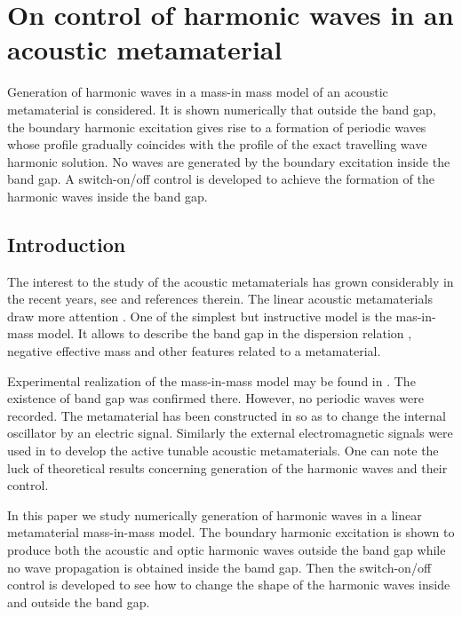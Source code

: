 \chapter{On control of harmonic waves in  an acoustic metamaterial}

Generation of harmonic waves in a mass-in mass model of an acoustic metamaterial is considered. It is shown numerically that outside the band gap, the boundary harmonic excitation gives rise to a formation of periodic waves whose profile gradually coincides with the profile of the exact travelling wave harmonic solution. No waves are generated by the boundary excitation inside the band gap. A switch-on/off control is developed to achieve the formation of the harmonic waves inside the band gap.
  
\section{Introduction}

The interest to the study of the acoustic metamaterials has grown considerably in the recent years, see \cite{Cummer,Cvet, Huang2010, Ma, muller, delis1, Eremeyev2020, Porubov2019, Erofeev2020} and references therein. The linear acoustic metamaterials draw  more attention \cite{Cvet, Huang2010,  muller}. One of the simplest but instructive model is the mas-in-mass model. It allows to describe the band gap in the dispersion relation \cite{Cvet, Huang2010}, negative effective mass  and other features related to a metamaterial. 

Experimental realization of the mass-in-mass  model may be found in \cite{Cvet,Yang, Yao2008, Zhou2015}. The existence of band gap was confirmed there. However, no periodic waves were recorded. The metamaterial has been constructed in \cite{Yang} so as to change the internal oscillator by an electric signal. Similarly the 
 external electromagnetic signals were used in \cite{Chen2014,Xiao2015} to develop the active tunable acoustic metamaterials. One can note the luck of theoretical results concerning generation of the harmonic waves and their control.

In this paper we study numerically generation  of harmonic waves in  a linear metamaterial mass-in-mass model.  The boundary harmonic excitation is shown to produce both the acoustic and optic harmonic waves outside the band gap while no wave propagation is obtained inside the bamd gap. Then the switch-on/off control is developed to see how to change the shape of the harmonic waves inside and outside the band gap.

